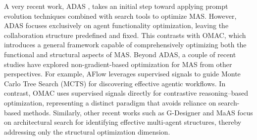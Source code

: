 



A very recent work, ADAS \cite{hu2024automated}, takes an initial step toward applying prompt evolution techniques combined with search tools to optimize MAS. However, ADAS focuses exclusively on agent functionality optimization, leaving the collaboration structure predefined and fixed. This contrasts with OMAC, which introduces a general framework capable of comprehensively optimizing both the functional and structural aspects of MAS. Beyond ADAS, a couple of recent studies have explored non-gradient-based optimization for MAS from other perspectives. For example, AFlow \cite{aflow} leverages supervised signals to guide Monte Carlo Tree Search (MCTS) for discovering effective agentic workflows. In contrast, OMAC uses supervised signals directly for contrastive reasoning–based optimization, representing a distinct paradigm that avoids reliance on search-based methods. Similarly, other recent works such as G-Designer \cite{zhang2025g} and MaAS \cite{zhang2025multi} focus on architectural search for identifying effective multi-agent structures, thereby addressing only the structural optimization dimension.

